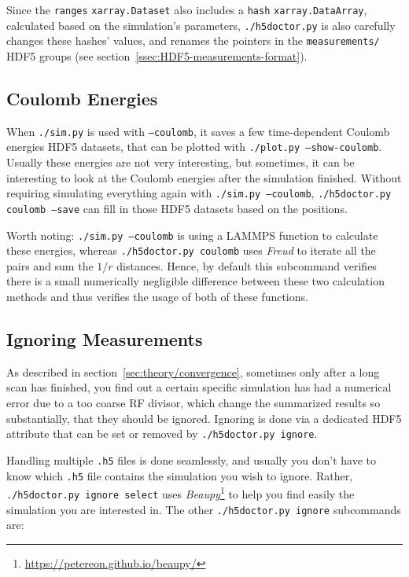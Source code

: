 Since the \texttt{ranges} \texttt{xarray.Dataset} also includes a \texttt{hash} \texttt{xarray.DataArray}, calculated based on the simulation's parameters,  \texttt{./h5doctor.py} is also carefully changes these hashes' values, and renames the pointers in the \texttt{measurements/} HDF5 groups (see section~\ref{ssec:HDF5-measurements-format}).

\subsection{Coulomb Energies}\label{ssec:h5doctor_coulomb}

When \texttt{./sim.py} is used with \texttt{--coulomb}, it saves a few time-dependent Coulomb energies HDF5 datasets, that can be plotted with \texttt{./plot.py --show-coulomb}. Usually these energies are not very interesting, but sometimes, it can be interesting to look at the Coulomb energies after the simulation finished. Without requiring simulating everything again with \texttt{./sim.py --coulomb}, \texttt{./h5doctor.py coulomb --save} can fill in those HDF5 datasets based on the positions.

Worth noting: \texttt{./sim.py --coulomb} is using a LAMMPS\cite{LAMMPS} function to calculate these energies, whereas \texttt{./h5doctor.py coulomb} uses \textit{Freud}\cite{freud} to iterate all the pairs and sum the $1/r$ distances. Hence, by default this subcommand verifies there is a small numerically negligible difference between these two calculation methods and thus verifies the usage of both of these functions.

\subsection{Ignoring Measurements}

As described in section~\ref{sec:theory/convergence}, sometimes only after a long scan has finished, you find out a certain specific simulation has had a numerical error due to a too coarse RF divisor, which change the summarized results so substantially, that they should be ignored. Ignoring is done via a dedicated HDF5 attribute that can be set or removed by \texttt{./h5doctor.py ignore}.

Handling multiple \texttt{.h5} files is done seamlessly, and usually you don't have to know which \texttt{.h5} file contains the simulation you wish to ignore. Rather, \texttt{./h5doctor.py ignore select} uses \textit{Beaupy}\footnote{\url{https://petereon.github.io/beaupy/}} to help you find easily the simulation you are interested in. The other \texttt{./h5doctor.py ignore} subcommands are:


